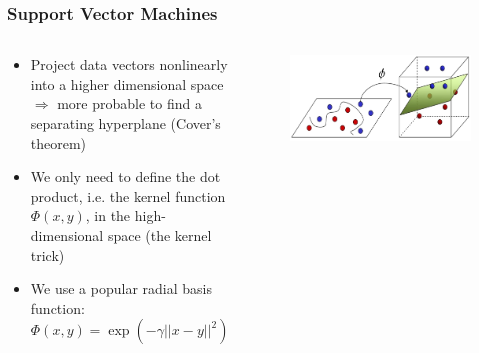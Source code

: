 \documentclass{beamer}
\begin{document}
\frame
{
  \frametitle{Support Vector Machines}

\begin{columns}
\begin{column}{6cm}
{\small
  \begin{itemize}
    \item Project data vectors nonlinearly into a higher dimensional space $\Rightarrow$ more probable to find a separating hyperplane (Cover's theorem)
    \item We only need to define the dot product, i.e. the kernel function $\Phi(x,y)$, in the high-dimensional space (the kernel trick)
    \item We use a popular radial basis function: $\Phi(x,y) = \exp(-\gamma||x-y||^2)$
  \end{itemize}
}
\end{column}
\begin{column}{5.5cm}
\begin{figure}
	\centering
		\includegraphics[width=\textwidth]{svm2.png}
	\label{fig:bridge}
\end{figure}
\end{column}
\end{columns}
}
\end{document}
